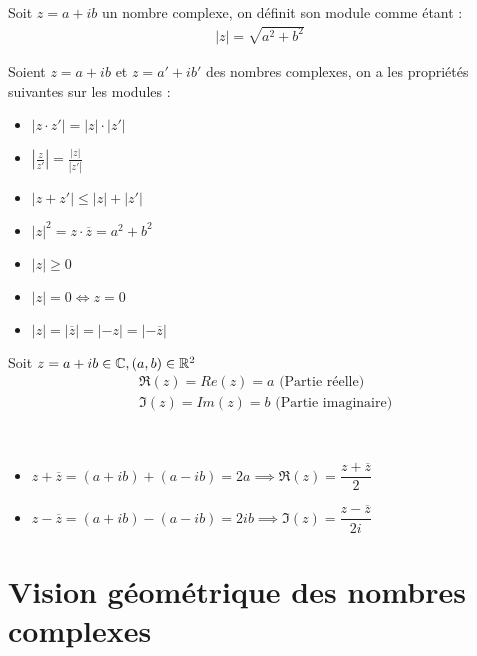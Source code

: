\begin{definition}
    Soit $z = a + ib$ un nombre complexe, on définit son module comme étant :
    \begin{align*}
        |z| = \sqrt{a^2 + b^2}
    \end{align*}
\end{definition}

\begin{proposition}
    Soient $z = a + ib$ et $z = a' + ib'$ des nombres complexes, on a les propriétés suivantes sur les modules :
    \begin{itemize}
        \item $|z \cdot z'| = |z| \cdot |z'|$
        \item $\left| \frac{z}{z'} \right| = \frac{|z|}{|z'|}$
        \item $|z + z'| \leq |z| + |z'|$
        \item $|z|^2 = z \cdot \overline{z} = a^2 + b^2$
        \item $|z| \geq 0$
        \item $|z| = 0 \iff z = 0$
        \item $|z| = |\overline{z}| = |-z| = |-\overline{z}|$
    \end{itemize}
\end{proposition}

\begin{definition}
    Soit $z = a + ib \in \mathbb{C}, (a, b) \in \mathbb{R}^2$
    \begin{align*}
        &\Re(z) = Re(z) = a \text{ (Partie réelle)} \\
        &\Im(z) = Im(z) = b \text{ (Partie imaginaire)}
    \end{align*}
\end{definition}

\begin{proposition}[Propriétés]~
    \begin{itemize}
        \item $z + \overline{z} = (a + ib) + (a - ib) = 2a \implies \Re(z) = \dfrac{z + \overline{z}}{2}$
        \item $z - \overline{z} = (a + ib) - (a - ib) = 2ib \implies \Im(z) = \dfrac{z - \overline{z}}{2i}$
    \end{itemize}
\end{proposition}

\section{Vision géométrique des nombres complexes}


